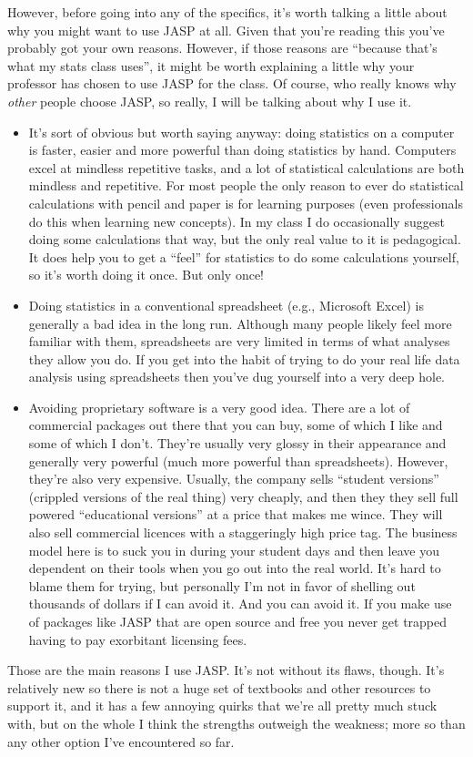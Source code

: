 However, before going into any of the specifics, it's worth talking a little about why you might want to use JASP at all. Given that you're reading this you've probably got your own reasons. However, if those reasons are ``because that's what my stats class uses'', it might be worth explaining a little why your professor has chosen to use JASP for the class. Of course, who really knows why {\it other} people choose JASP, so really, I will be talking about why I use it.
\begin{itemize}
\item It's sort of obvious but worth saying anyway: doing statistics on a computer is faster, easier and more powerful than doing statistics by hand. Computers excel at mindless repetitive tasks, and a lot of statistical calculations are both mindless and repetitive. For most people the only reason to ever do statistical calculations with pencil and paper is for learning purposes (even professionals do this when learning new concepts). In my class I do occasionally suggest doing some calculations that way, but the only real value to it is pedagogical. It does help you to get a ``feel'' for statistics to do some calculations yourself, so it's worth doing it once. But only once!
\item Doing statistics in a conventional spreadsheet (e.g., Microsoft Excel) is generally a bad idea in the long run. Although many people likely feel more familiar with them, spreadsheets are very limited in terms of what analyses they allow you do. If you get into the habit of trying to do your real life data analysis using spreadsheets then you've dug yourself into a very deep hole.
\item Avoiding proprietary software is a very good idea. There are a lot of commercial packages out there that you can buy, some of which I like and some of which I don't. They're usually very glossy in their appearance and generally very powerful (much more powerful than spreadsheets). However, they're also very expensive. Usually, the company sells ``student versions'' (crippled versions of the real thing) very cheaply, and then they they sell full powered ``educational versions'' at a price that makes me wince. They will also sell commercial licences with a staggeringly high price tag. The business model here is to suck you in during your student days and then leave you dependent on their tools when you go out into the real world. It's hard to blame them for trying, but personally I'm not in favor of shelling out thousands of dollars if I can avoid it. And you can avoid it. If you make use of packages like JASP that are open source and free you never get trapped having to pay exorbitant licensing fees. 
\end{itemize}
Those are the main reasons I use JASP. It's not without its flaws, though. It's relatively new so there is not a huge set of textbooks and other resources to support it, and it has a few annoying quirks that we're all pretty much stuck with, but on the whole I think the strengths outweigh the weakness; more so than any other option I've encountered so far. 


